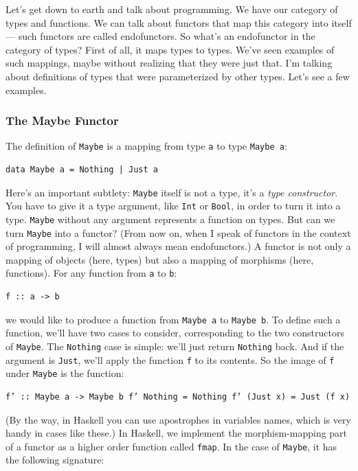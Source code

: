 Let's get down to earth and talk about programming. We have our category
of types and functions. We can talk about functors that map this
category into itself --- such functors are called endofunctors. So
what's an endofunctor in the category of types? First of all, it maps
types to types. We've seen examples of such mappings, maybe without
realizing that they were just that. I'm talking about definitions of
types that were parameterized by other types. Let's see a few examples.

\subsubsection{The Maybe Functor}\label{the-maybe-functor}

The definition of \texttt{Maybe} is a mapping from type \texttt{a} to
type \texttt{Maybe\ a}:

\begin{verbatim}
data Maybe a = Nothing | Just a
\end{verbatim}

Here's an important subtlety: \texttt{Maybe} itself is not a type, it's
a \emph{type constructor}. You have to give it a type argument, like
\texttt{Int} or \texttt{Bool}, in order to turn it into a type.
\texttt{Maybe} without any argument represents a function on types. But
can we turn \texttt{Maybe} into a functor? (From now on, when I speak of
functors in the context of programming, I will almost always mean
endofunctors.) A functor is not only a mapping of objects (here, types)
but also a mapping of morphisms (here, functions). For any function from
\texttt{a} to \texttt{b}:

\begin{verbatim}
f :: a -> b
\end{verbatim}

we would like to produce a function from \texttt{Maybe\ a} to
\texttt{Maybe\ b}. To define such a function, we'll have two cases to
consider, corresponding to the two constructors of \texttt{Maybe}. The
\texttt{Nothing} case is simple: we'll just return \texttt{Nothing}
back. And if the argument is \texttt{Just}, we'll apply the function
\texttt{f} to its contents. So the image of \texttt{f} under
\texttt{Maybe} is the function:

\begin{verbatim}
f’ :: Maybe a -> Maybe b f’ Nothing = Nothing f’ (Just x) = Just (f x)
\end{verbatim}

(By the way, in Haskell you can use apostrophes in variables names,
which is very handy in cases like these.) In Haskell, we implement the
morphism-mapping part of a functor as a higher order function called
\texttt{fmap}. In the case of \texttt{Maybe}, it has the following
signature:

